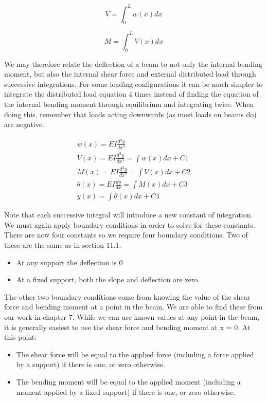 \documentclass[
  letterpaper,
  DIV=11,
  numbers=noendperiod]{scrreprt}
\begin{document}
\[
V=\int_{0}^{L} w(x) d x
\]

\[
M=\int_{0}^{L} V(x) d x
\]

We may therefore relate the deflection of a beam to not only the
internal bending moment, but also the internal shear force and external
distributed load through successive integrations. For some loading
configurations it can be much simpler to integrate the distributed load
equation 4 times instead of finding the equation of the internal bending
moment through equilibrium and integrating twice. When doing this,
remember that loads acting downwards (as most loads on beams do) are
negative.

\[
\begin{gathered}
w(x)=E I \frac{d^{4} y}{d x^{4}} \\
V(x)=E I \frac{d^{3} y}{d x^{3}}=\int w(x) d x+C 1 \\
M(x)=E I \frac{d^{2} y}{d x^{2}}=\int V(x) d x+C 2 \\
\theta(x)=E I \frac{d y}{d x}=\int M(x) d x+C 3 \\
y(x)=\int \theta(x) d x+C 4
\end{gathered}
\]

Note that each successive integral will introduce a new constant of
integration. We must again apply boundary conditions in order to solve
for these constants. There are now four constants so we require four
boundary conditions. Two of these are the same as in section 11.1:

\begin{itemize}
\item
  At any support the deflection is 0
\item
  At a fixed support, both the slope and deflection are zero
\end{itemize}

The other two boundary conditions come from knowing the value of the
shear force and bending moment at a point in the beam. We are able to
find these from our work in chapter 7. While we can use known values at
any point in the beam, it is generally easiest to use the shear force
and bending moment at x = 0. At this point:

\begin{itemize}
\item
  The shear force will be equal to the applied force (including a force
  applied by a support) if there is one, or zero otherwise.
\item
  The bending moment will be equal to the applied moment (including a
  moment applied by a fixed support) if there is one, or zero otherwise.
\end{itemize}
\end{document}
